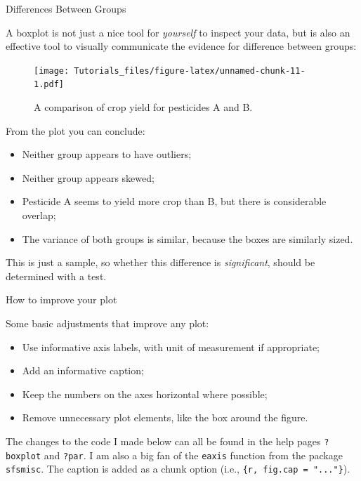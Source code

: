 \documentclass[
]{book}
\providecommand{\tightlist}{%
  \setlength{\itemsep}{0pt}\setlength{\parskip}{0pt}}
\begin{document}
Differences Between Groups

A boxplot is not just a nice tool for \emph{yourself} to inspect your data, but is also an effective tool to visually communicate the evidence for difference between groups:

\begin{figure}
\centering
\texttt{[image: Tutorials\_files/figure-latex/unnamed-chunk-11-1.pdf]}
\caption{\label{fig:unnamed-chunk-11}A comparison of crop yield for pesticides A and B.}
\end{figure}

From the plot you can conclude:

\begin{itemize}
\tightlist
\item
  Neither group appears to have outliers;
\item
  Neither group appears skewed;
\item
  Pesticide A seems to yield more crop than B, but there is considerable overlap;
\item
  The variance of both groups is similar, because the boxes are similarly sized.
\end{itemize}

This is just a sample, so whether this difference is \emph{significant}, should be determined with a test.

How to improve your plot

Some basic adjustments that improve any plot:

\begin{itemize}
\tightlist
\item
  Use informative axis labels, with unit of measurement if appropriate;
\item
  Add an informative caption;
\item
  Keep the numbers on the axes horizontal where possible;
\item
  Remove unnecessary plot elements, like the box around the figure.
\end{itemize}

The changes to the code I made below can all be found in the help pages \texttt{?boxplot} and \texttt{?par}. I am also a big fan of the \texttt{eaxis} function from the package \texttt{sfsmisc}. The caption is added as a chunk option (i.e., \texttt{\textasciigrave{}\textasciigrave{}\textasciigrave{}\{r,\ fig.cap\ =\ "..."\}}).
\end{document}
